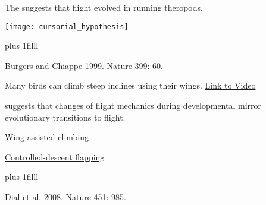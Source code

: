 \documentclass[t]{beamer}
\begin{document}
\begin{frame}[t,plain]{The  suggests that flight evolved in running theropods.}
	\begin{center}
		\texttt{[image: cursorial\_hypothesis]}
	\end{center}

	\vskip0pt plus 1filll
	
	\tiny	Burgers and Chiappe 1999. Nature 399: 60.
\end{frame}

{
\begin{frame}[b,plain]{Many birds can climb steep inclines using their wings.}
	\tiny\hspace{1.1in} \href{https://www.youtube.com/watch?v=Owf2iEwV-gk}{Link to Video}
\end{frame}
}
{
\begin{frame}[t,plain]{ suggests that changes of flight mechanics during developmental mirror evolutionary transitions to flight.}

\vspace{1cm}

\hangpara\hspace{19em}\href{https://www.youtube.com/watch?v=5Rjin-tjOxU}{Wing-assisted climbing}

\hangpara\hspace{19em}\href{https://www.youtube.com/watch?v=FhDQvRBngkQ}{Controlled-descent flapping}

\vskip0pt plus 1filll

\tiny\hfill Dial et al. 2008. Nature 451: 985.
\end{frame}
}
\end{document}
